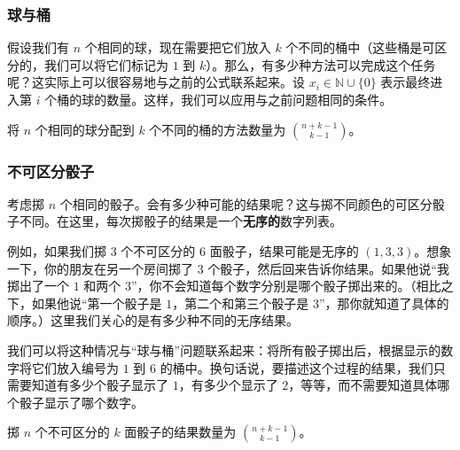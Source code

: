 \subsubsection*{球与桶}

假设我们有 $n$ 个相同的球，现在需要把它们放入 $k$ 个不同的桶中（这些桶是可区分的，我们可以将它们标记为 $1$ 到 $k$）。那么，有多少种方法可以完成这个任务呢？这实际上可以很容易地与之前的公式联系起来。设 $x_i \in \mathbb{N} \cup \{0\}$ 表示最终进入第 $i$ 个桶的球的数量。这样，我们可以应用与之前问题相同的条件。

\begin{tcolorbox}[colback=blue!10,
    colframe=blue,
    width=\textwidth,
    arc=2mm, auto outer arc,
    breakable,enhanced jigsaw,
    before upper={\parindent15pt\noindent},	]
    将 $n$ 个相同的球分配到 $k$ 个不同的桶的方法数量为 ${n+k-1 \choose k-1}$。
\end{tcolorbox}

\subsubsection*{不可区分骰子}

考虑掷 $n$ 个相同的骰子。会有多少种可能的结果呢？这与掷不同颜色的可区分骰子不同。在这里，每次掷骰子的结果是一个\textbf{无序的}数字列表。

例如，如果我们掷 $3$ 个不可区分的 $6$ 面骰子，结果可能是无序的 $(1, 3, 3)$。想象一下，你的朋友在另一个房间掷了 $3$ 个骰子，然后回来告诉你结果。如果他说``我掷出了一个 $1$ 和两个 $3$''，你不会知道每个数字分别是哪个骰子掷出来的。（相比之下，如果他说``第一个骰子是 $1$，第二个和第三个骰子是 $3$''，那你就知道了具体的顺序。）这里我们关心的是有多少种不同的无序结果。

我们可以将这种情况与``球与桶''问题联系起来：将所有骰子掷出后，根据显示的数字将它们放入编号为 $1$ 到 $6$ 的桶中。换句话说，要描述这个过程的结果，我们只需要知道有多少个骰子显示了 $1$，有多少个显示了 $2$，等等，而不需要知道具体哪个骰子显示了哪个数字。

\begin{tcolorbox}[colback=blue!10,
    colframe=blue,
    width=\textwidth,
    arc=2mm, auto outer arc,
    breakable,enhanced jigsaw,
    before upper={\parindent15pt\noindent},	]
    掷 $n$ 个不可区分的 $k$ 面骰子的结果数量为 ${n+k-1 \choose k-1}$。
\end{tcolorbox}